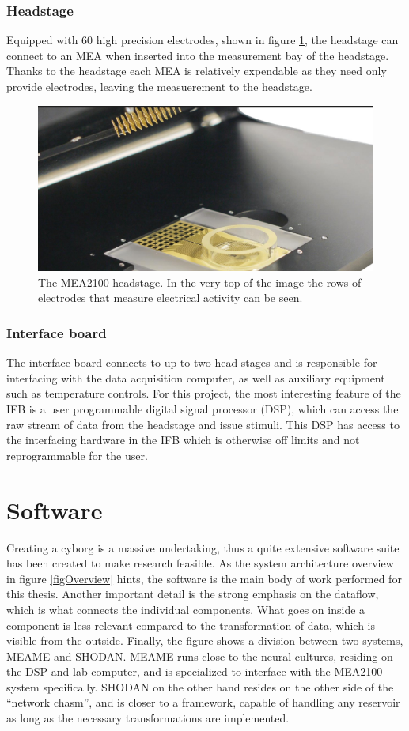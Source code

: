 \subsubsection{Headstage}
Equipped with 60 high precision electrodes, shown in figure \ref{openHeadstage}, the
headstage can connect to an MEA when inserted into the measurement bay of the
headstage.
Thanks to the headstage each MEA is relatively expendable as they need only
provide electrodes, leaving the measuerement to the headstage.
\begin{figure}[h!]
  \centering
  \includegraphics[width=1\textwidth]{fig/hs_placeholder.png}
  \caption{
    The MEA2100 headstage. In the very top of the image the rows of electrodes
    that measure electrical activity can be seen.
  }
  \label{openHeadstage}
\end{figure}
\subsubsection{Interface board}
The interface board connects to up to two head-stages and is responsible for
interfacing with the data acquisition computer, as well as auxiliary equipment
such as temperature controls.
For this project, the most interesting feature of the IFB is a user programmable
digital signal processor (DSP), which can access the raw stream of data from the
headstage and issue stimuli.
This DSP has access to the interfacing hardware in the IFB which is otherwise
off limits and not reprogrammable for the user.
\section{Software}
Creating a cyborg is a massive undertaking, thus a quite extensive software
suite has been created to make research feasible.
As the system architecture overview in figure \ref{figOverview} hints, the software is the
main body of work performed for this thesis.
Another important detail is the strong emphasis on the dataflow, which is what
connects the individual components.
What goes on inside a component is less relevant compared to the transformation
of data, which is visible from the outside.
Finally, the figure shows a division between two systems, MEAME and SHODAN.
MEAME runs close to the neural cultures, residing on the DSP and lab computer,
and is specialized to interface with the MEA2100 system specifically.
SHODAN on the other hand resides on the other side of the ``network chasm'', and
is closer to a framework, capable of handling any reservoir as long as the
necessary transformations are implemented.
